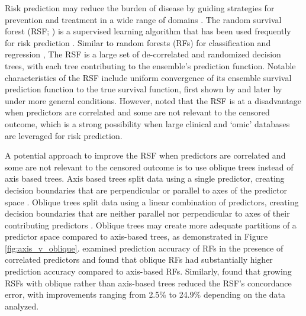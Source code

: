 \documentclass[12pt]{article}\usepackage[]{graphicx}\usepackage[]{xcolor}
\begin{document}
Risk prediction may reduce the burden of disease by guiding strategies for prevention and treatment in a wide range of domains \citep{moons2012riskI}. The random survival forest (RSF; \citet{ishwaran2008random, hothorn2006unbiased}) is a supervised learning algorithm that has been used frequently for risk prediction \citep{wang2017selective}. Similar to random forests (RFs) for classification and regression \citep{breiman2001random}, The RSF is a large set of de-correlated and randomized decision trees, with each tree contributing to the ensemble's prediction function. Notable characteristics of the RSF include uniform convergence of its ensemble survival prediction function to the true survival function, first shown by \citet{ishwaran2010consistency} and later by \citet{cui2017consistency} under more general conditions. However, \citet{cui2017consistency} noted that the RSF is at a disadvantage when predictors are correlated and some are not relevant to the censored outcome, which is a strong possibility when large clinical and `omic' databases are leveraged for risk prediction.

A potential approach to improve the RSF when predictors are correlated and some are not relevant to the censored outcome is to use oblique trees instead of axis based trees. Axis based trees split data using a single predictor, creating decision boundaries that are perpendicular or parallel to axes of the predictor space \citep[see][Chapter~2]{breiman2017classification}. Oblique trees split data using a linear combination of predictors, creating decision boundaries that are neither parallel nor perpendicular to axes of their contributing predictors \citep[see][Chapter~5]{breiman2017classification}. Oblique trees may create more adequate partitions of a predictor space compared to axis-based trees, as demonstrated in Figure \ref{fig:axis_v_oblique}. \citet{menze2011oblique} examined prediction accuracy of RFs in the presence of correlated predictors and found that oblique RFs had substantially higher prediction accuracy compared to axis-based RFs. Similarly, \citet{jaeger2019oblique} found that growing RSFs with oblique rather than axis-based trees reduced the RSF's concordance error, with improvements ranging from 2.5\% to 24.9\% depending on the data analyzed.
\end{document}

